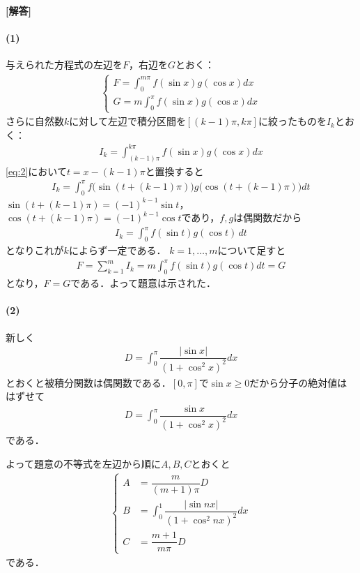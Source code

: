 \documentclass[../../main.tex]{subfiles}
\begin{document}
\begin{oframed}
  
\end{oframed}

{\bf [解答]}
\paragraph{(1)}

与えられた方程式の左辺を$F$，右辺を$G$とおく：
\begin{align}
  \begin{cases}
    F=\displaystyle\int_0^{m\pi}f(\sin x)g(\cos x)dx \\
    G=m\displaystyle\int_0^\pi f(\sin x)g(\cos x)dx
  \end{cases} \label{eq:1}
\end{align}
さらに自然数$k$に対して左辺で積分区間を$[(k-1)\pi,k\pi]$に絞ったものを$I_k$とおく：
\begin{align}
  I_k=\displaystyle\int_{(k-1)\pi}^{k\pi}f(\sin x)g(\cos x)dx \label{eq:2}
\end{align}
\cref{eq:2}において$t=x-(k-1)\pi$と置換すると
\begin{align}
  I_k=\int_0^\pi f\bigl(\sin(t+(k-1)\pi)\bigr)g\bigl(\cos(t+(k-1)\pi)\bigr)dt
\end{align}
$\sin(t+(k-1)\pi)=(-1)^{k-1}\sin t$，$\cos(t+(k-1)\pi)=(-1)^{k-1}\cos t$であり，$f,g$は偶関数だから
\begin{align}
  I_k=\int_0^\pi f(\sin t)g(\cos t)\,dt
\end{align}
となりこれが$k$によらず一定である．
$k=1,\dots,m$について足すと
\begin{align}
  F=\sum_{k=1}^mI_k=m\int_0^\pi f(\sin t)g(\cos t)dt=G
\end{align}
となり，$F=G$である．よって題意は示された．

\paragraph{(2)}
新しく
\begin{align}
  D= \int_0^\pi\dfrac{|\sin x|}{(1+\cos^2x)^2}dx
\end{align}
とおくと被積分関数は偶関数である．$[0,\pi]$で$\sin x\ge0$だから分子の絶対値ははずせて
\begin{align}
  D= \int_0^\pi\dfrac{\sin x}{(1+\cos^2x)^2}dx
\end{align}
である．

よって題意の不等式を左辺から順に$A,B,C$とおくと
\begin{align}
  \begin{cases}
    A &= \dfrac{m}{(m+1)\pi} D \\
    B &= \int_0^1\dfrac{|\sin nx|}{(1+\cos^2 nx)^2}dx \\
    C &= \dfrac{m+1}{m\pi} D
  \end{cases} \label{eq:3}
\end{align}
である．
\end{document}

